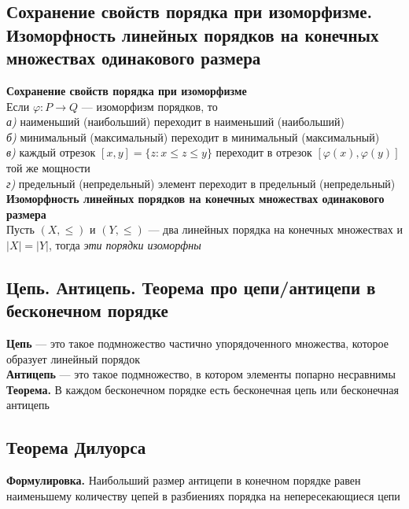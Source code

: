 \documentclass[a4paper]{article}
\begin{document}
\subsection{Сохранение свойств порядка при изоморфизме. Изоморфность линейных порядков на конечных множествах одинакового размера}
\noindent\textbf{Сохранение свойств порядка при изоморфизме}\\[2mm]
\indent Если $\varphi:P\to Q$ — изоморфизм порядков, то\\[2mm]
\indent\indent\textit{а)} наименьший (наибольший) переходит в наименьший (наибольший)\\[2mm]
\indent\indent\textit{б)} минимальный (максимальный) переходит в минимальный (максимальный)\\[2mm]
\indent\indent\textit{в)} каждый отрезок $[x,y]=\{z:x\leqslant z\leqslant y\}$ переходит в отрезок $[\varphi(x),\varphi(y)]$ той же мощности\\[2mm]
\indent\indent\textit{г)} предельный (непредельный) элемент переходит в предельный (непредельный)\\[2mm]
\textbf{Изоморфность линейных порядков на конечных множествах одинакового размера}\\[2mm]
\indent Пусть $(X,\leqslant)$ и $(Y,\leqslant)$ — два линейных порядка на конечных множествах и $|X|=|Y|$, тогда \textit{эти порядки изоморфны}

\subsection{Цепь. Антицепь. Теорема про цепи/антицепи в бесконечном порядке}
\textbf{Цепь} — это такое подмножество частично упорядоченного множества, которое образует линейный порядок\\[2mm]
\indent\textbf{Антицепь} — это такое подмножество, в котором элементы попарно несравнимы\\[3mm]
\indent\textbf{Теорема.} В каждом бесконечном порядке есть бесконечная цепь или бесконечная антицепь

\subsection{Теорема Дилуорса}
\textbf{Формулировка.} Наибольший размер антицепи в конечном порядке равен наименьшему количеству цепей в разбиениях порядка на непересекающиеся цепи
\end{document}

